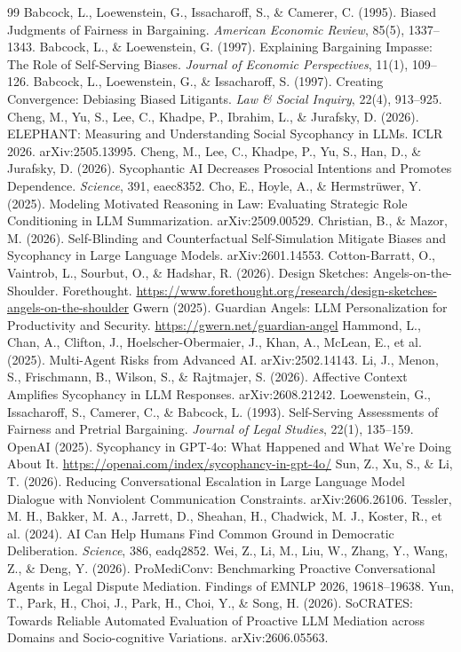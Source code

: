 \documentclass[10.5pt]{extarticle}
\begin{document}
\begin{thebibliography}{99}\small
{} Babcock, L., Loewenstein, G., Issacharoff, S., \& Camerer, C. (1995). Biased Judgments of Fairness in Bargaining. \emph{American Economic Review}, 85(5), 1337--1343.
 Babcock, L., \& Loewenstein, G. (1997). Explaining Bargaining Impasse: The Role of Self-Serving Biases. \emph{Journal of Economic Perspectives}, 11(1), 109--126.
 Babcock, L., Loewenstein, G., \& Issacharoff, S. (1997). Creating Convergence: Debiasing Biased Litigants. \emph{Law \& Social Inquiry}, 22(4), 913--925.
 Cheng, M., Yu, S., Lee, C., Khadpe, P., Ibrahim, L., \& Jurafsky, D. (2026). ELEPHANT: Measuring and Understanding Social Sycophancy in LLMs. ICLR 2026. arXiv:2505.13995.
 Cheng, M., Lee, C., Khadpe, P., Yu, S., Han, D., \& Jurafsky, D. (2026). Sycophantic AI Decreases Prosocial Intentions and Promotes Dependence. \emph{Science}, 391, eaec8352.
 Cho, E., Hoyle, A., \& Hermstr\"uwer, Y. (2025). Modeling Motivated Reasoning in Law: Evaluating Strategic Role Conditioning in LLM Summarization. arXiv:2509.00529.
 Christian, B., \& Mazor, M. (2026). Self-Blinding and Counterfactual Self-Simulation Mitigate Biases and Sycophancy in Large Language Models. arXiv:2601.14553.
 Cotton-Barratt, O., Vaintrob, L., Sourbut, O., \& Hadshar, R. (2026). Design Sketches: Angels-on-the-Shoulder. Forethought. \url{https://www.forethought.org/research/design-sketches-angels-on-the-shoulder}
 Gwern (2025). Guardian Angels: LLM Personalization for Productivity and Security. \url{https://gwern.net/guardian-angel}
 Hammond, L., Chan, A., Clifton, J., Hoelscher-Obermaier, J., Khan, A., McLean, E., et al. (2025). Multi-Agent Risks from Advanced AI. arXiv:2502.14143.
 Li, J., Menon, S., Frischmann, B., Wilson, S., \& Rajtmajer, S. (2026). Affective Context Amplifies Sycophancy in LLM Responses. arXiv:2608.21242.
 Loewenstein, G., Issacharoff, S., Camerer, C., \& Babcock, L. (1993). Self-Serving Assessments of Fairness and Pretrial Bargaining. \emph{Journal of Legal Studies}, 22(1), 135--159.
 OpenAI (2025). Sycophancy in GPT-4o: What Happened and What We're Doing About It. \url{https://openai.com/index/sycophancy-in-gpt-4o/}
 Sun, Z., Xu, S., \& Li, T. (2026). Reducing Conversational Escalation in Large Language Model Dialogue with Nonviolent Communication Constraints. arXiv:2606.26106.
 Tessler, M. H., Bakker, M. A., Jarrett, D., Sheahan, H., Chadwick, M. J., Koster, R., et al. (2024). AI Can Help Humans Find Common Ground in Democratic Deliberation. \emph{Science}, 386, eadq2852.
 Wei, Z., Li, M., Liu, W., Zhang, Y., Wang, Z., \& Deng, Y. (2026). ProMediConv: Benchmarking Proactive Conversational Agents in Legal Dispute Mediation. Findings of EMNLP 2026, 19618--19638.
 Yun, T., Park, H., Choi, J., Park, H., Choi, Y., \& Song, H. (2026). SoCRATES: Towards Reliable Automated Evaluation of Proactive LLM Mediation across Domains and Socio-cognitive Variations. arXiv:2606.05563.
\end{thebibliography}
\end{document}
